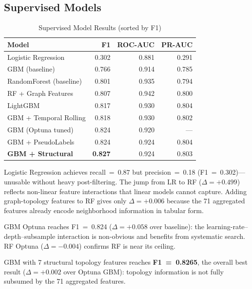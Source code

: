 \documentclass[conference]{IEEEtran}
\begin{document}
\subsection{Supervised Models}

\begin{table}[htbp]
\centering
\caption{Supervised Model Results (sorted by F1)}
\label{tab:supervised}
\renewcommand{\arraystretch}{1.1}
\begin{tabular}{@{}lrrr@{}}
\toprule
Model & F1 & ROC-AUC & PR-AUC \\
\midrule
Logistic Regression       & 0.302 & 0.881 & 0.291 \\
GBM (baseline)            & 0.766 & 0.914 & 0.785 \\
RandomForest (baseline)   & 0.801 & 0.935 & 0.794 \\
RF + Graph Features       & 0.807 & 0.942 & 0.800 \\
LightGBM                  & 0.817 & 0.930 & 0.804 \\
GBM + Temporal Rolling    & 0.818 & 0.930 & 0.802 \\
GBM (Optuna tuned)        & 0.824 & 0.920 & ---   \\
GBM + PseudoLabels        & 0.824 & 0.924 & 0.804 \\
\textbf{GBM + Structural} &\textbf{0.827}& 0.924 & 0.803 \\
\bottomrule
\end{tabular}
\end{table}

Logistic Regression achieves recall~=~0.87 but precision~=~0.18
(F1~=~0.302)---unusable without heavy post-filtering.  The jump from LR to
RF ($\Delta{=}+0.499$) reflects non-linear feature interactions that linear
models cannot capture.  Adding graph-topology features to RF gives only
$\Delta{=}+0.006$ because the 71 aggregated features already encode
neighborhood information in tabular form.

GBM Optuna reaches F1~=~0.824 ($\Delta{=}+0.058$ over baseline): the
learning-rate--depth--subsample interaction is non-obvious and benefits
from systematic search.  RF Optuna ($\Delta{=}-0.004$) confirms RF is near
its ceiling.

GBM with 7 structural topology features reaches \textbf{F1~=~0.8265}, the
overall best result ($\Delta{=}+0.002$ over Optuna GBM): topology information
is not fully subsumed by the 71 aggregated features.
\end{document}
